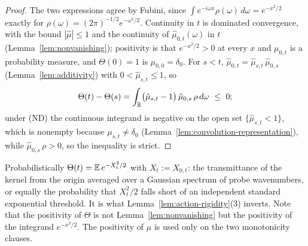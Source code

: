 \begin{proof}
The two expressions agree by Fubini, since $\int e^{-i\omega x}\rho(\omega)\,d\omega =
e^{-x^2/2}$ exactly for $\rho(\omega) = (2\pi)^{-1/2}e^{-\omega^2/2}$. Continuity in $t$ is
dominated convergence, with the bound $|\hat\mu| \le 1$ and the continuity of
$\hat\mu_{0,t}(\omega)$ in $t$ (Lemma~\ref{lem:nonvanishing}); positivity is that
$e^{-x^2/2} > 0$ at every $x$ and $\mu_{0,t}$ is a probability measure, and
$\Theta(0) = 1$ is $\mu_{0,0} = \delta_0$. For $s < t$, $\hat\mu_{0,t} =
\hat\mu_{s,t}\,\hat\mu_{0,s}$ (Lemma~\ref{lem:additivity}) with $0 < \hat\mu_{s,t} \le 1$, so
\[
  \Theta(t) - \Theta(s)
  = \int_{\mathbb{R}} \bigl(\hat\mu_{s,t} - 1\bigr)\,\hat\mu_{0,s}\,\rho\,d\omega \ \le\ 0 ;
\]
under (ND) the continuous integrand is negative on the open set $\{\hat\mu_{s,t} < 1\}$, which
is nonempty because $\mu_{s,t} \ne \delta_0$ (Lemma~\ref{lem:convolution-representation}),
while $\hat\mu_{0,s}\,\rho > 0$, so the inequality is strict.
\end{proof}

Probabilistically $\Theta(t) = \mathbb{E}\,e^{-X_t^2/2}$ with $X_t := X_{0,t}$: the transmittance of
the kernel from the origin averaged over a Gaussian spectrum of probe wavenumbers, or equally the
probability that $X_t^2/2$ falls short of an independent standard exponential threshold.
It is what Lemma~\ref{lem:action-rigidity}(3) inverts.
Note that the positivity of $\Theta$ is not Lemma~\ref{lem:nonvanishing} but the positivity
of the integrand $e^{-x^2/2}$. The positivity of $\hat\mu$ is used only on the two
monotonicity clauses.
